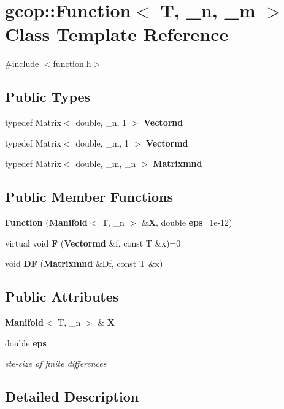 \section{gcop\-:\-:\-Function$<$ \-T, \-\_\-n, \-\_\-m $>$ \-Class \-Template \-Reference}
\label{classgcop_1_1Function}


{\ttfamily \#include $<$function.\-h$>$}

\subsection*{\-Public \-Types}
\begin{DoxyCompactItemize}
\item 
typedef \-Matrix$<$ double, \-\_\-n, 1 $>$ {\bf \-Vectornd}
\item 
typedef \-Matrix$<$ double, \-\_\-m, 1 $>$ {\bf \-Vectormd}
\item 
typedef \-Matrix$<$ double, \-\_\-m, \-\_\-n $>$ {\bf \-Matrixmnd}
\end{DoxyCompactItemize}
\subsection*{\-Public \-Member \-Functions}
\begin{DoxyCompactItemize}
\item 
{\bf \-Function} ({\bf \-Manifold}$<$ \-T, \-\_\-n $>$ \&{\bf \-X}, double {\bf eps}=1e-\/12)
\item 
virtual void {\bf \-F} ({\bf \-Vectormd} \&f, const \-T \&x)=0
\item 
void {\bf \-D\-F} ({\bf \-Matrixmnd} \&\-Df, const \-T \&x)
\end{DoxyCompactItemize}
\subsection*{\-Public \-Attributes}
\begin{DoxyCompactItemize}
\item 
{\bf \-Manifold}$<$ \-T, \-\_\-n $>$ \& {\bf \-X}
\item 
double {\bf eps}
\begin{DoxyCompactList}\small\item\em ste-\/size of finite differences \end{DoxyCompactList}\end{DoxyCompactItemize}


\subsection{\-Detailed \-Description}
